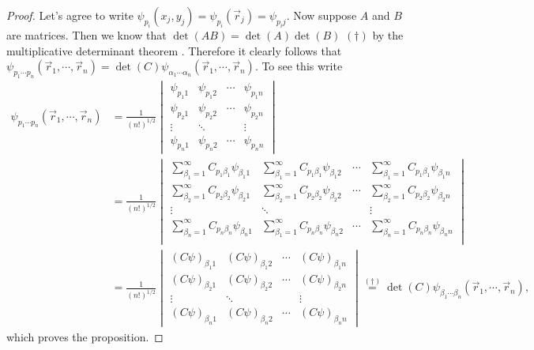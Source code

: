 \documentclass[11pt,english,a4paper]{article}
\begin{document}
\begin{proof}
Let's agree to write $\psi_{p_i}(x_j,y_j) = \psi_{p_i}(\vec{r}_j) = \psi_{  p_ij}$. Now suppose $A$ and $B$ are matrices. Then we know that $\det(AB) = \det(A)\det(B)$ $(\dagger)$ by the multiplicative determinant theorem \parencite[173]{lay_linear_2012}. Therefore it clearly follows that $\psi_{  p_1\cdots p_n}(\vec{r}_1,\cdots, \vec{r}_n) = \det(C)\psi_{  \alpha_1\cdots \alpha_n}(\vec{r}_1,\cdots, \vec{r}_n)$. To see this write
\begin{align*}
\psi_{  p_1\cdots p_n}(\vec{r}_1,\cdots, \vec{r}_n) &=  \frac{1}{(n!)^{1/2}}
\begin{vmatrix}
\psi_{  p_1 1} & \psi_{  p_1 2} & \cdots & \psi_{  p_1 n}\\
\psi_{  p_2 1} & \psi_{  p_2 2} & \cdots & \psi_{  p_2 n}\\
\vdots & \ddots && \vdots\\
\psi_{  p_n 1} & \psi_{  p_n 2} & \cdots & \psi_{  p_n n}
\end{vmatrix}\\
&=
\frac{1}{(n!)^{1/2}}\begin{vmatrix}
\sum_{  \beta_1=1}^\infty C_{  p_1\beta_1}\psi_{  \beta_1 1} & \sum_{  \beta_1=1}^\infty C_{  p_1\beta_1}\psi_{  \beta_1 2} & \cdots & \sum_{  \beta_1=1}^\infty C_{  p_1\beta_1}\psi_{  \beta_1 n}\\
\sum_{  \beta_2=1}^\infty C_{  p_2\beta_2}\psi_{  \beta_2 1} & \sum_{  \beta_2=1}^\infty C_{  p_2\beta_2}\psi_{  \beta_2 2} & \cdots & \sum_{  \beta_2=1}^\infty C_{  p_2\beta_2}\psi_{  \beta_2 n}\\
\vdots & \ddots && \vdots\\
\sum_{  \beta_n=1}^\infty C_{  p_n\beta_n}\psi_{  \beta_n 1} & \sum_{  \beta_1=1}^\infty C_{  p_n\beta_n}\psi_{  \beta_n 2} & \cdots & \sum_{  \beta_n=1}^\infty C_{  p_n\beta_n}\psi_{  \beta_n n}\\
\end{vmatrix}\\
&=
\frac{1}{(n!)^{1/2}}\begin{vmatrix}
(C \psi)_{  \beta_1 1} & (C \psi)_{  \beta_1 2} & \cdots & (C \psi)_{  \beta_1 n}\\
(C \psi)_{  \beta_2 1} & (C \psi)_{  \beta_2 2} & \cdots & (C \psi)_{  \beta_2 n}\\
\vdots & \ddots && \vdots\\
(C \psi)_{  \beta_n 1} & (C \psi)_{  \beta_n 2} & \cdots & (C \psi)_{  \beta_n n}
\end{vmatrix} \stackrel{(\dagger)}{=} \det(C)\psi_{  \beta_1\cdots \beta_n}(\vec{r}_1,\cdots, \vec{r}_n),
\end{align*}
which proves the proposition. 
\end{proof}
\end{document}
